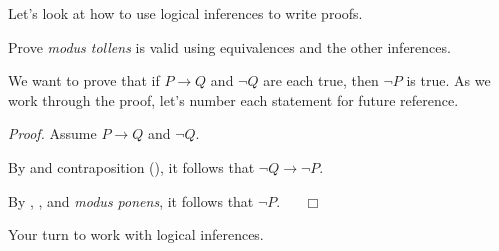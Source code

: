 Let's look at how to use logical inferences to write proofs.    

\begin{exam}
\label{exam_prove_mt_using_equiv_and_infer}
    Prove \emph{modus tollens} is valid using equivalences and the other inferences.
            \begin{soln}
                We want to prove that if $P \to Q$ and $\neg Q$ are each true, then $\neg P$ is true.
                As we work through the proof, let's number each statement for future reference.
                
                \emph{Proof.}
                Assume  $P \to Q$ and  $\neg Q$.  
                
                By  and contraposition (), it follows that  $\neg Q \to \neg P$.  
                
                By , , and \emph{modus ponens}, it follows that $\neg P$. ~ \hfill ~$\Box$             
            \end{soln}
\end{exam}

Your turn to work with logical inferences.  

